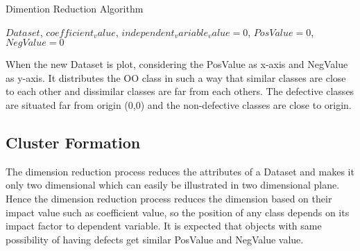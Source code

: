 \documentclass[12pt]{report}
\begin{document}
\begin{algorithm}
\caption{Dimention Reduction Algorithm}
\label{dimention_reduction}
\begin{algorithmic}[1]
\REQUIRE  $ Dataset$, $coefficient_value$, $independent_variable_value=0$, $PosValue=0$,$NegValue=0$ 
		
				
							\ELSE
									
							\ENDIF
				\ENDFOR
				
		\ENDFOR
		

\end{algorithmic}
\end{algorithm}

When the new Dataset is plot, considering the PosValue as x-axis and NegValue as y-axis. It distributes the OO class in such a way that similar classes are close to each other and dissimilar classes are far from each others. The defective classes are situated far from origin (0,0) and the non-defective classes are close to origin.  

\subsection{Cluster Formation}

The dimension reduction process reduces the attributes of a Dataset and makes it only two dimensional which can easily be illustrated in two dimensional plane. Hence the dimension reduction process reduces the dimension based on their impact value such as coefficient value, so the position of any class depends on its impact factor to dependent variable. It is expected that objects with same possibility of having defects get similar PosValue and NegValue value.
 
\end{document}
